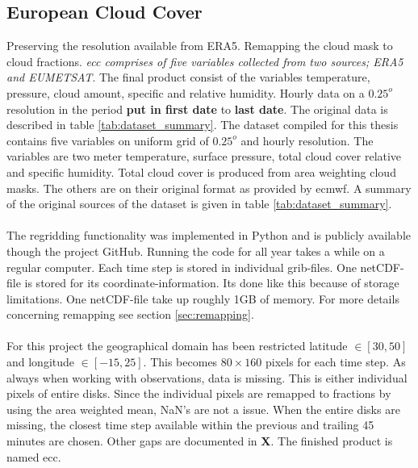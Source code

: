 \subsection{European Cloud Cover} \label{sec:ecc}
Preserving the resolution available from ERA5. Remapping the cloud mask to cloud fractions. \textit{\acrshort{ecc} comprises of five variables collected from two sources; ERA5 and EUMETSAT}. The final product consist of the variables temperature, pressure, cloud amount, specific and relative humidity. Hourly data on a $0.25^o$ resolution in the period \textbf{put in first date} to \textbf{last date}. The original data is described in table \ref{tab:dataset_summary}. The dataset compiled for this thesis contains five variables on uniform grid of $0.25^o$ and hourly resolution. The variables are two meter temperature, surface pressure, total cloud cover relative and specific humidity. Total cloud cover is produced from area weighting cloud masks. The others are on their original format as provided by \acrfull{ecmwf}. A summary of the original sources of the dataset is given in table \ref{tab:dataset_summary}.
\\ \\
The regridding functionality was implemented in Python and is publicly available though the project GitHub. Running the code for all year takes a while on a regular computer. Each time step is stored in individual grib-files. One netCDF-file is stored for its coordinate-information. Its done like this because of storage limitations. One netCDF-file take up roughly 1GB of memory. For more details concerning remapping see section \ref{sec:remapping}. 
\\ \\
For this project the geographical domain has been restricted latitude $\in[30,50]$ and longitude $\in [-15, 25]$. This becomes $80\times160$ pixels for each time step. As always when working with observations, data is missing. This is either individual pixels of entire disks. Since the individual pixels are remapped to fractions by using the area weighted mean, NaN's are not a issue. When the entire disks are missing, the closest time step available within the previous and trailing 45 minutes are chosen. Other gaps are documented in \textbf{X}. The finished product is named \acrfull{ecc}.
